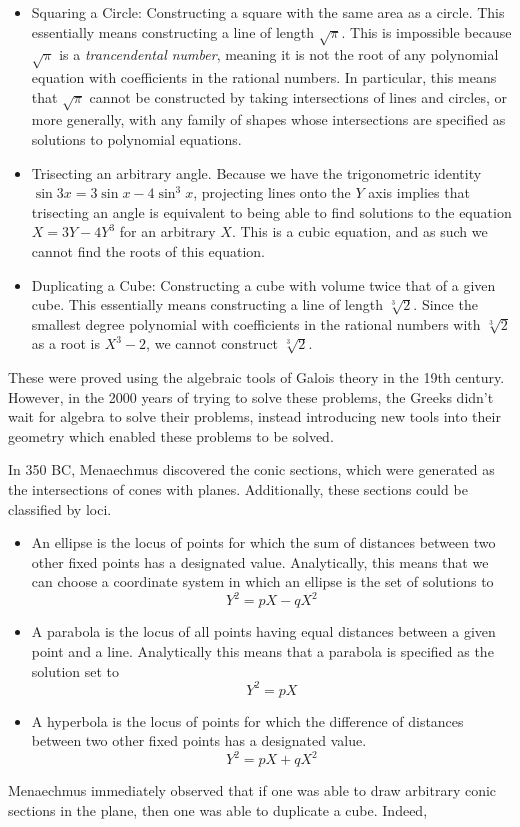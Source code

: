\begin{itemize}
    \item Squaring a Circle: Constructing a square with the same area as a circle. This essentially means constructing a line of length $\sqrt{\pi}$. This is impossible because $\sqrt{\pi}$ is a {\it trancendental number}, meaning it is not the root of any polynomial equation with coefficients in the rational numbers. In particular, this means that $\sqrt{\pi}$ cannot be constructed by taking intersections of lines and circles, or more generally, with any family of shapes whose intersections are specified as solutions to polynomial equations.
    \item Trisecting an arbitrary angle. Because we have the trigonometric identity $\sin 3x = 3 \sin x - 4 \sin^3 x$, projecting lines onto the $Y$ axis implies that trisecting an angle is equivalent to being able to find solutions to the equation $X = 3Y - 4Y^3$ for an arbitrary $X$. This is a cubic equation, and as such we cannot find the roots of this equation.
    \item Duplicating a Cube: Constructing a cube with volume twice that of a given cube. This essentially means constructing a line of length $\sqrt[3]{2}$. Since the smallest degree polynomial with coefficients in the rational numbers with $\sqrt[3]{2}$ as a root is $X^3 - 2$, we cannot construct $\sqrt[3]{2}$.
\end{itemize}
%
These were proved using the algebraic tools of Galois theory in the 19th century. However, in the 2000 years of trying to solve these problems, the Greeks didn't wait for algebra to solve their problems, instead introducing new tools into their geometry which enabled these problems to be solved.

In 350 BC, Menaechmus discovered the conic sections, which were generated as the intersections of cones with planes. Additionally, these sections could be classified by loci.
%
\begin{itemize}
    \item An ellipse is the locus of points for which the sum of distances between two other fixed points has a designated value. Analytically, this means that we can choose a coordinate system in which an ellipse is the set of solutions to
    \[ Y^2 = pX - qX^2 \]
    \item A parabola is the locus of all points having equal distances between a given point and a line. Analytically this means that a parabola is specified as the solution set to
    \[ Y^2 = pX \]
    \item A hyperbola is the locus of points for which the difference of distances between two other fixed points has a designated value.
    \[ Y^2 = pX + qX^2 \]
\end{itemize}
%
Menaechmus immediately observed that if one was able to draw arbitrary conic sections in the plane, then one was able to duplicate a cube. Indeed, 

